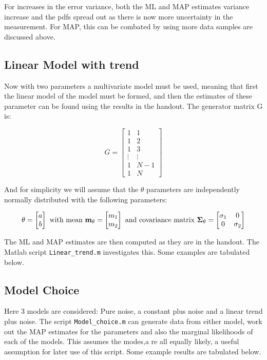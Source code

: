 \documentclass[12pt]{article}
\begin{document}
For increases in the error variance, both the ML and MAP estimates variance increase and the pdfs spread out as there is now more uncertainty in the measurement. For MAP, this can be combated by using more data samples are discussed above.

\subsection{Linear Model with trend}
Now with two parameters a multivariate model must be used, meaning that first the linear model of the model must be formed, and then the estimates of these parameter can be found using the results in the handout. The generator matrix G is:

\[ 
G = 
\begin{bmatrix}
1 & 1 \\
1 & 2 \\
1 & 3 \\
\vdots & \vdots \\
1 & N-1\\
1& N
\end{bmatrix}
\]

And for simplicity we will assume that the $\theta$ parameters are independently normally distributed with the following parameters:

\[
\theta = 
\begin{bmatrix}
a \\ b
\end{bmatrix}
\text{ with mean }
\bold{m_{\theta}} = \begin{bmatrix}
m_1 \\ m_2
\end{bmatrix}
\text{ and covariance matrix }
\bold{\Sigma_{\theta}} = \begin{bmatrix}
\sigma_1 & 0 \\ 0 & \sigma_2
\end{bmatrix}
\]

The ML and MAP estimates are then computed as they are in the handout. The Matlab script \texttt{Linear\_trend.m} investigates this. Some examples are tabulated below.

\subsection{Model Choice}
Here 3 models are considered: Pure noise, a constant plus noise and a linear trend plus noise. The script \texttt{Model\_choice.m} can generate data from either model, work out the MAP estimates for the parameters and also the marginal likelihoods of each of the models. This assumes the modes,a re all equally likely, a useful assumption for later use of this script. Some example results are tabulated below.
\end{document}
